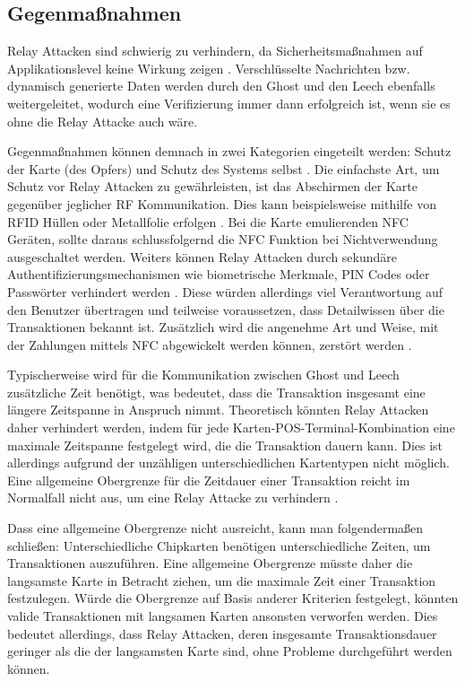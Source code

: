 \subsection{Gegenmaßnahmen}

Relay Attacken sind schwierig zu verhindern, da Sicherheitsmaßnahmen auf Applikationslevel keine Wirkung zeigen \cite{nfcRelayWithOffTheShelfHardAndSoftware}. Verschlüsselte Nachrichten bzw. dynamisch generierte Daten werden durch den Ghost und den Leech ebenfalls weitergeleitet, wodurch eine Verifizierung immer dann erfolgreich ist, wenn sie es ohne die Relay Attacke auch wäre.

Gegenmaßnahmen können demnach in zwei Kategorien eingeteilt werden: Schutz der Karte (des Opfers) und Schutz des Systems selbst \cite{nfcRelayWithOffTheShelfHardAndSoftware}. Die einfachste Art, um Schutz vor Relay Attacken zu gewährleisten, ist das Abschirmen der Karte gegenüber jeglicher RF Kommunikation. Dies kann beispielsweise mithilfe von RFID Hüllen oder Metallfolie erfolgen \cite{nfcRelayWithOffTheShelfHardAndSoftware}. Bei die Karte emulierenden NFC Geräten, sollte daraus schlussfolgernd die NFC Funktion bei Nichtverwendung ausgeschaltet werden.
Weiters können Relay Attacken durch sekundäre Authentifizierungsmechanismen wie biometrische Merkmale, PIN Codes oder Passwörter verhindert werden \cite{nfcRelayWithOffTheShelfHardAndSoftware}. Diese würden allerdings viel Verantwortung auf den Benutzer übertragen und teilweise voraussetzen, dass Detailwissen über die Transaktionen bekannt ist. Zusätzlich wird die angenehme Art und Weise, mit der Zahlungen mittels NFC abgewickelt werden können, zerstört werden \cite{practicalNfcPeerToPeerRelayMobilePhones}. 

Typischerweise wird für die Kommunikation zwischen Ghost und Leech zusätzliche Zeit benötigt, was bedeutet, dass die Transaktion insgesamt eine längere Zeitspanne in Anspruch nimmt. Theoretisch könnten Relay Attacken daher verhindert werden, indem für jede Karten-POS-Terminal-Kombination eine maximale Zeitspanne festgelegt wird, die die Transaktion dauern kann. Dies ist allerdings aufgrund der unzähligen unterschiedlichen Kartentypen nicht möglich. Eine allgemeine Obergrenze für die Zeitdauer einer Transaktion reicht im Normalfall nicht aus, um eine Relay Attacke zu verhindern \cite{nfcRelayWithOffTheShelfHardAndSoftware}. 

Dass eine allgemeine Obergrenze nicht ausreicht, kann man folgendermaßen schließen: Unterschiedliche Chipkarten benötigen unterschiedliche Zeiten, um Transaktionen auszuführen. Eine allgemeine Obergrenze müsste daher die langsamste Karte in Betracht ziehen, um die maximale Zeit einer Transaktion festzulegen. Würde die Obergrenze auf Basis anderer Kriterien festgelegt, könnten valide Transaktionen mit langsamen Karten ansonsten verworfen werden. Dies bedeutet allerdings, dass Relay Attacken, deren insgesamte Transaktionsdauer geringer als die der langsamsten Karte sind, ohne Probleme durchgeführt werden können. 

